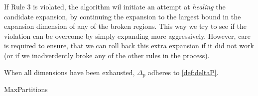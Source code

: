 If Rule 3 is violated, the algorithm wil initiate an attempt at \textit{healing}
the candidate expansion, by continuing the expansion to the largest bound in
the expansion dimension of any of the broken regions. This way we try to see if
the violation can be overcome by simply expanding more aggressively. However,
care is required to ensure, that we can roll back this extra expansion if it did
not work (or if we inadverdently broke any of the other rules in the process).

When all dimensions have been
exhausted, $\Delta_{p}$ adheres to \cref{def:deltaP}.

\begin{algorithm}[!ht]
    \caption{MaxPartitions}\label{alg:MaxPartitions}

    \begin{algorithmic}[1]




            \item[]

                \EndIf%



\end{algorithmic}
\end{algorithm}
